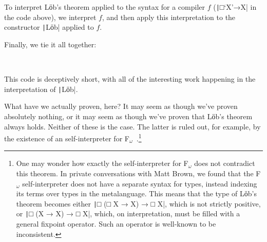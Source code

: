 \begin{code}%
\>  \AgdaSymbol{:}   \<%
\\
\>      \AgdaSymbol{=}       \<%
\\
\>     \<[14]%
\>[14]\AgdaSymbol{=}  \<%
\\
%
\\
\>  \AgdaSymbol{:}  \AgdaSymbol{\{} \AgdaSymbol{:} \AgdaSymbol{\}}       \<%
\\
\>     \AgdaSymbol{=}    \AgdaSymbol{(} \AgdaSymbol{)}\<%
\end{code}
 To interpret Lӧb's theorem applied to the syntax for a compiler $f$
 (\texttt|□‘X’→X| in the code above), we interpret $f$, and
 then apply this interpretation to the constructor
 \texttt|Lӧb| applied to $f$.

 Finally, we tie it all together:

\begin{code}%
\>  \AgdaSymbol{:}  \AgdaSymbol{\{}\AgdaSymbol{\}}   \AgdaSymbol{(}   \AgdaSymbol{)}    \<%
\\
\>   \AgdaSymbol{=}    \<%
\end{code}

 This code is deceptively short, with all of the interesting work
 happening in the interpretation of \texttt|Lӧb|.

 What have we actually proven, here?  It may seem as though we've
 proven absolutely nothing, or it may seem as though we've proven that
 Lӧb's theorem always holds.  Neither of these is the case.  The
 latter is ruled out, for example, by the existence of an
 self-interpreter for
 F$_\omega$~\cite{brown2016breaking}.\footnote{One may wonder how
 exactly the self-interpreter for F$_\omega$ does not contradict this
 theorem.  In private conversations with Matt Brown, we found that the
 F$_\omega$ self-interpreter does not have a separate syntax for
 types, instead indexing its terms over types in the metalanguage.
 This means that the type of Lӧb's theorem becomes either
 \texttt|□ (□ X → X) → □ X|, which is not strictly positive,
 or \texttt|□ (X → X) → □ X|, which, on interpretation, must
 be filled with a general fixpoint operator.  Such an operator is
 well-known to be inconsistent.}

